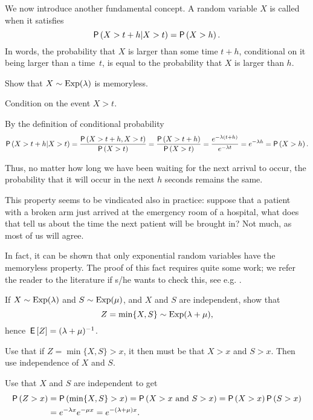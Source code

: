 We now introduce another fundamental concept.
A random variable $X$ is called  when it satisfies
\begin{equation*}
  \P{X > t+h | X>t} = \P{X>h}.
\end{equation*}
In words, the probability that $X$ is larger than some time $t+h$, conditional on it being larger than a time~$t$, is equal to the probability that $X$ is larger than $h$.

\begin{exercise}
  Show that $X\sim \operatorname{Exp}(\lambda)$ is memoryless.

  \begin{hint}
Condition on the event ${X>t}$. 
  \end{hint}
  \begin{solution}
By  the definition of conditional probability
\begin{equation*}
  \P{X>t+h|X>t} = \frac{\P{X>t+h, X>t}}{\P{X>t}} = \frac{\P{X>t+h}}{\P{X>t}} = \frac{e^{-\lambda(t+h)}}{e^{-\lambda t}} = e^{-\lambda h} = \P{X>h}.
\end{equation*}

Thus, no matter how long we have been waiting for the next arrival to occur, the probability that it will occur in the next $h$ seconds remains the same.

This property seems to be vindicated also in practice: suppose that a patient with a broken arm just arrived at the emergency room of a hospital, what does that tell us about the time the next patient will be brought in?
Not much, as most of us will agree.
  \end{solution}
\end{exercise}

In fact, it can be shown that only exponential random variables have the memoryless property.
The proof of this fact requires quite some work; we refer the reader to the literature if s/he wants to check this, see e.g.
\citet[Appendix 3]{yushkevich69:_markov_proces}.

\begin{extra}\label{ex:10}
  If $X\sim\operatorname{Exp}(\lambda)$ and $S\sim\operatorname{Exp}(\mu)$, and $X$ and $S$ are
  independent, show that 
  \begin{equation*}
Z=\min\{X,S\}\sim\operatorname{Exp}(\lambda+\mu),
  \end{equation*}
hence $\,\mathsf{E}\left[Z\right] = (\lambda+\mu)^{-1}$.
\begin{hint}
Use that if $Z=\min\{X, S\}>x$,  it then must be that $X>x$
  and $S>x$. Then use independence of $X$ and $S$.
\end{hint}
  \begin{solution}
Use that $X$ and $S$ are independent to get
    \begin{equation*}
      \begin{split}
      \P{Z>x} 
&= \P{\min\{X,S\}>x} = \P{X>x\text{ and } S>x} = \P{X>x}\P{S>x} \\
&= e^{-\lambda x} e^{-\mu x} = e^{-(\lambda+\mu)x}.
      \end{split}
    \end{equation*}
  \end{solution}
\end{extra}

